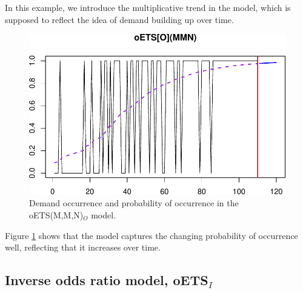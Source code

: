 \documentclass[]{book}
\theoremstyle{definition}
\theoremstyle{definition}
\theoremstyle{definition}
\theoremstyle{definition}
\theoremstyle{remark}
\begin{document}
In this example, we introduce the multiplicative trend in the model, which is supposed to reflect the idea of demand building up over time.

\begin{figure}
\centering
\includegraphics{Svetunkov--2022----ADAM_files/figure-latex/oETSOModel-1.pdf}
\caption{\label{fig:oETSOModel}Demand occurrence and probability of occurrence in the oETS(M,M,N)\(_O\) model.}
\end{figure}

Figure \ref{fig:oETSOModel} shows that the model captures the changing probability of occurrence well, reflecting that it increases over time.

\hypertarget{oETSI}{%
\subsection{\texorpdfstring{Inverse odds ratio model, oETS\(_I\)}{Inverse odds ratio model, oETS\_I}}\label{oETSI}}
\end{document}
